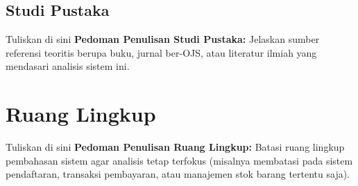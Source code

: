 \subsection{Studi Pustaka}


Tuliskan di sini \textbf{Pedoman Penulisan Studi Pustaka:} Jelaskan sumber referensi teoritis berupa buku, jurnal ber-OJS, atau literatur ilmiah yang mendasari analisis sistem ini.


\section{Ruang Lingkup}


Tuliskan di sini \textbf{Pedoman Penulisan Ruang Lingkup:} Batasi ruang lingkup pembahasan sistem agar analisis tetap terfokus (misalnya membatasi pada sistem pendaftaran, transaksi pembayaran, atau manajemen stok barang tertentu saja).

